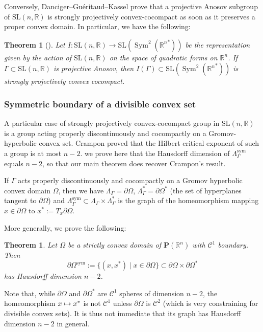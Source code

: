 \documentclass[JEP,XML,SOM,Unicode,NoEqCountersInSection,NoFloatCountersInSection,published]{cedram}
\newcommand{\sym}{\mathrm{sym}}
\newcommand\mto{\mathchoice{\longmapsto}{\mapsto}{\mapsto}{\mapsto}}
\newtheorem{theorem}[theo]{Theorem}
\theoremstyle{definition}
\newcommand{\proj}{\mathbf{P}}
\newcommand{\R}{\mathbb{R}}
\newcommand{\SL}{\mathrm{SL}}
\DeclareMathOperator{\Sym}{Sym}
\begin{document}
Conversely, Danciger--Guéritaud--Kassel prove that a projective Anosov subgroup of $\SL(n,\R)$ is strongly projectively convex-cocompact as soon as it preserves a proper convex domain. In particular, we have the following:

\begin{theorem}[\cite{DGK}] \label{th - projective anosov are convex cocompact}
Let $I: \SL(n,\R) \to \SL(\Sym^2({\R^n}^*))$ be the representation given by the action of $\SL(n,\R)$ on the space of quadratic forms on $\R^n$. If~$\Gamma \subset \SL(n,\R)$ is projective Anosov, then $I(\Gamma) \subset \SL(\Sym^2({\R^n}^*))$ is strongly projectively convex cocompact.
\end{theorem}

\subsubsection{Symmetric boundary of a divisible convex set}

A particular case of strongly projectively convex-cocompact group in $\SL(n,\R)$ is a group acting properly discontinuously and cocompactly on a Gromov-hyperbolic convex set. Crampon proved that the Hilbert critical exponent of such a group is at most $n-2$. we prove here that the Hausdorff dimension of $\Lambda_\Gamma^{\sym}$ equals $n-2$, so that our main theorem does recover Crampon's result.

If $\Gamma$ acts properly discontinuously and cocompactly on a Gromov hyperbolic convex domain $\Omega$, then we have $\Lambda_\Gamma = \partial \Omega$, $\Lambda_\Gamma^* = \partial \Omega^*$ (the set of hyperplanes tangent to $\partial\Omega$) and $\Lambda^{\sym}_\Gamma \subset \Lambda_\Gamma \times \Lambda_\Gamma^*$ is the graph of the homeomorphism mapping $x\in \partial\Omega$ to $x^* := T_x \partial \Omega$.

More generally, we prove the following:
\begin{theorem} \label{theo - HD Symmetric boundary convex}
Let $\Omega$ be a strictly convex domain of $\proj(\R^n)$ with $\mathcal C^1$ boundary. Then
\[\partial \Omega^{\sym} := \{(x,x^*)\mid x\in \partial \Omega\} \subset \partial \Omega \times \partial \Omega^*\]
has Hausdorff dimension $n-2$.
\end{theorem}

Note that, while $\partial \Omega$ and $\partial\Omega^*$ are $\mathcal C^1$ spheres of dimension $n-2$, the homeomorphism $x\mto x^*$ is not $\mathcal C^1$ unless $\partial \Omega$ is $\mathcal C^2$ (which is very constraining for divisible convex sets). It is thus not immediate that its graph has Hausdorff dimension $n-2$ in general.
\end{document}
